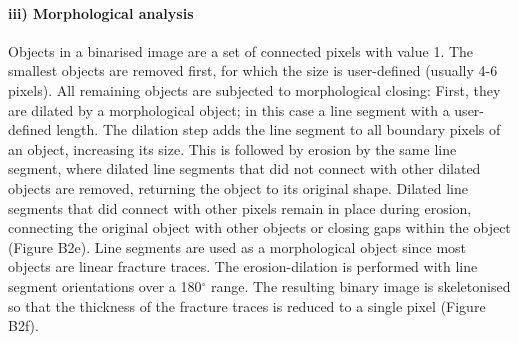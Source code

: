 \documentclass{article}
\begin{document}
\begin{multicols}{2}

\paragraph{iii) Morphological analysis}
Objects in a binarised image are a set of connected pixels with value 1. The smallest objects are removed first, for which the size is user-defined (usually 4-6 pixels). All remaining objects are subjected to morphological closing: First, they are dilated by a morphological object; in this case a line segment with a user-defined length. The dilation step adds the line segment to all boundary pixels of an object, increasing its size. This is followed by erosion by the same line segment, where dilated line segments that did not connect with other dilated objects are removed, returning the object to its original shape. Dilated line segments that did connect with other pixels remain in place during erosion, connecting the original object with other objects or closing gaps within the object (Figure B2e). Line segments are used as a morphological object since most objects are linear fracture traces. The erosion-dilation is performed with line segment orientations over a 180$^{\circ}$ range. The resulting binary image is skeletonised so that the thickness of the fracture traces is reduced to a single pixel (Figure B2f). 


\end{multicols}
\end{document}
